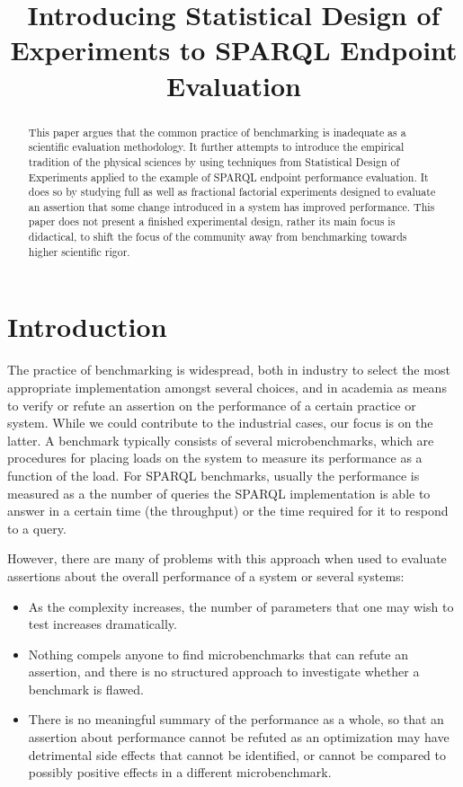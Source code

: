 \documentclass{article}
\title{Introducing Statistical Design of Experiments to SPARQL
  Endpoint Evaluation}
\begin{document}
\maketitle

\begin{abstract}
This paper argues that the common practice of benchmarking is
inadequate as a scientific evaluation methodology. It further attempts
to introduce the empirical tradition of the physical sciences by using
techniques from Statistical Design of Experiments applied to the
example of SPARQL endpoint performance evaluation. It does so by
studying full as well as fractional factorial experiments designed to
evaluate an assertion that some change introduced in a system has
improved performance. This paper does not present a finished
experimental design, rather its main focus is didactical, to shift the
focus of the community away from benchmarking towards higher
scientific rigor.
\end{abstract}

\section{Introduction}

The practice of benchmarking is widespread, both in industry to select
the most appropriate implementation amongst several choices, and in
academia as means to verify or refute an assertion on the performance
of a certain practice or system. While we could contribute to the
industrial cases, our focus is on the latter. A benchmark typically
consists of several microbenchmarks, which are procedures for placing
loads on the system to measure its performance as a function of the
load. For SPARQL benchmarks, usually the performance is measured as a
the number of queries the SPARQL implementation is able to answer in a
certain time (the throughput) or the time required for it to respond
to a query.

However, there are many of problems with this approach when used to
evaluate assertions about the overall performance of a system or
several systems: 
\begin{itemize}
\item As the complexity increases, the number of parameters that
one may wish to test increases dramatically.
\item Nothing compels anyone to find microbenchmarks that
  can refute an assertion, and there is no structured approach to
  investigate whether a benchmark is flawed.
\item There is no meaningful summary of the performance as a whole, so
  that an assertion about performance cannot be refuted as an
  optimization may have detrimental side effects that cannot be
  identified, or cannot be compared to possibly positive effects in a
  different microbenchmark.
\end{itemize}
\end{document}
